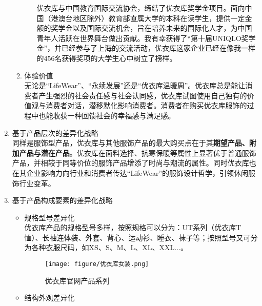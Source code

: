 \documentclass{xjtureport}
\begin{document}
\begin{enumerate}
\begin{enumerate}
\begin{itemize}
        优衣库与中国教育国际交流协会，缔结了优衣库奖学金项目。面向中国（港澳台地区除外）教育部直属大学的本科在读学生，提供一定金额的奖学金以及国际交流机会，旨在培养未来的国际化人才，为中国青年人活跃在世界舞台做出贡献。我有幸获得了“第十届UNIQLO奖学金”，并已经参与了上海的交流活动，优衣库这家企业已经在像我一样的456名获得奖项的大学生心中树立了榜样。
    \end{itemize}
    \item 体验价值\\
    无论是“LifeWear”、“永续发展”还是“优衣库温暖周”。优衣库总是能让消费者产生强烈的社会责任感与社会认同感，优衣库试图使用自己独有的价值观与消费者对话，潜移默化影响消费者。消费者在购买优衣库服饰的过程中也能收获一种回馈社会的幸福感与满足感。
\end{enumerate}
    \item 基于产品层次的差异化战略\\
    同样是服饰型产品，优衣库与其他服饰产品的最大购买点在于其\textbf{期望产品、附加产品与潜在产品}。优衣库在面料选择、抗寒保暖等属性上显著优于普通服饰产品，并相较于同等价位的服饰产品增添了时尚与潮流的属性。同时优衣库也在其企业影响力向行业和消费者传达“LifeWear”的服饰设计哲学，引领休闲服饰行业变革。
    \item 基于产品构成要素的差异化战略
    \begin{itemize}
        \item 规格型号差异化\\
        优衣库产品的规格型号多样，按照规格可以分为：UT系列（优衣库T恤）、长袖连体装、外套、背心、运动衫、睡衣、袜子等；按照型号又可分为各种衣服尺码，如XS、S、M、L、XL、XXL$\ldots$。
        \begin{figure}[H]
            \begin{center}
            \texttt{[image: figure/优衣库女装.png]}
            \end{center}
            \caption{优衣库官网产品系列\cite{ref11}}
        \end{figure}
        \item 结构外观差异化\\

\end{itemize}
\end{enumerate}
\end{document}

